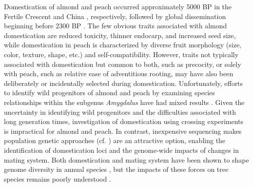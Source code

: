 \documentclass[12pt]{article}
\begin{document}
Domestication of almond and peach occurred approximately 5000 BP in the Fertile Crescent and China \citep{zohary2012domestication}, respectively, followed by global dissemination beginning before 2300 BP \citep{hedrick1917peaches, edwards1975almond, gradziel2011origin, zheng2014archaeological}. 
%
The few obvious traits associated with almond domestication are reduced toxicity, thinner endocarp, and increased seed size, while domestication in peach is characterized by diverse fruit morphology (size, color, texture, shape, etc.) and self-compatibility.
%
However, traits not typically associated with domestication but common to both, such as precocity, or solely with peach, such as relative ease of adventitious rooting, may have also been deliberately or incidentally selected during domestication. 
%
Unfortunately, efforts to identify wild progenitors of almond and peach by examining species relationships within the subgenus \emph{Amygdalus} have had mixed results \citep{verde2013high, aradhya2004molecular, zeinalabedini2010origin, mowrey1990isozyme, browicz1996genus, ladizinsky1999origin, bassi20081}. 
%
Given the uncertainty in identifying wild progenitors and the difficulties associated with long generation times, investigation of domestication using crossing experiments is impractical for almond and peach.
%
In contrast, inexpensive sequencing makes population genetic approaches (cf. \citealp{ross2007plant}) are an attractive option, enabling the identification of domestication loci and the genome-wide impacts of changes in mating system.   
%
Both domestication and mating system have been shown to shape genome diversity in annual species \citep{glemin2006impact, doebley2006molecular, slotte2013capsella}, but the impacts of these forces on tree species remains poorly understood \citep{mckey2010evolutionary, miller2011forest}.
\end{document}
